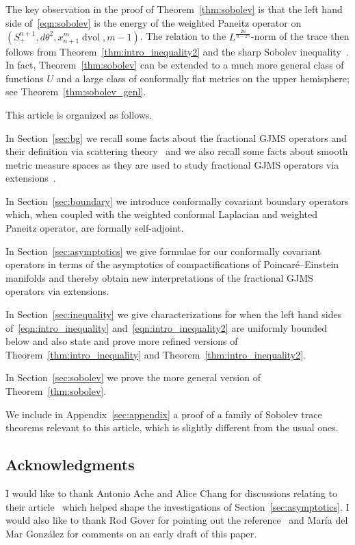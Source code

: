 \documentclass{amsart}
\theoremstyle{definition}
\theoremstyle{remark}
\numberwithin{equation}{section}
\begin{document}
The key observation in the proof of Theorem~\ref{thm:sobolev} is that the left hand side of~\eqref{eqn:sobolev} is the energy of the weighted Paneitz operator on $(S_+^{n+1},d\theta^2,x_{n+1}^m\operatorname{dvol},m-1)$.  The relation to the $L^{\frac{2n}{n-2\gamma}}$-norm of the trace then follows from Theorem~\ref{thm:intro_inequality2} and the sharp Sobolev inequality~\cite{CotsiolisTavoularis2004,FrankLieb2012b,Lieb1983}.  In fact, Theorem~\ref{thm:sobolev} can be extended to a much more general class of functions $U$ and a large class of conformally flat metrics on the upper hemisphere; see Theorem~\ref{thm:sobolev_genl}.

This article is organized as follows.

In Section~\ref{sec:bg} we recall some facts about the fractional GJMS operators and their definition via scattering theory~\cite{GrahamZworski2003} and we also recall some facts about smooth metric measure spaces as they are used to study fractional GJMS operators via extensions~\cite{CaseChang2013}.

In Section~\ref{sec:boundary} we introduce conformally covariant boundary operators which, when coupled with the weighted conformal Laplacian and weighted Paneitz operator, are formally self-adjoint.

In Section~\ref{sec:asymptotics} we give formulae for our conformally covariant operators in terms of the asymptotics of compactifications of Poincar\'e--Einstein manifolds and thereby obtain new interpretations of the fractional GJMS operators via extensions.

In Section~\ref{sec:inequality} we give characterizations for when the left hand sides of~\eqref{eqn:intro_inequality} and~\eqref{eqn:intro_inequality2} are uniformly bounded below and also state and prove more refined versions of Theorem~\ref{thm:intro_inequality} and Theorem~\ref{thm:intro_inequality2}.

In Section~\ref{sec:sobolev} we prove the more general version of Theorem~\ref{thm:sobolev}.

We include in Appendix~\ref{sec:appendix} a proof of a family of Sobolev trace theorems relevant to this article, which is slightly different from the usual ones.

\subsection*{Acknowledgments}

I would like to thank Antonio Ache and Alice Chang for discussions relating to their article~\cite{AcheChang2015} which helped shape the investigations of Section~\ref{sec:asymptotics}.  I would also like to thank Rod Gover for pointing out the reference~\cite{Grant2003} and Mar\'ia del Mar Gonz\'alez for comments on an early draft of this paper.
\end{document}
